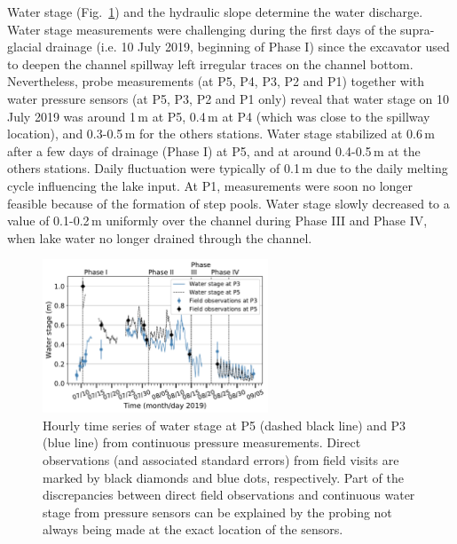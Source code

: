 Water stage (Fig.~\ref{fig:stage_P5_P3}) and the hydraulic slope determine the water discharge.
Water stage measurements were challenging  during the first days of the supra-glacial drainage (i.e. 10 July 2019, beginning of Phase I) since the excavator used to deepen the channel spillway left irregular traces on the channel bottom. Nevertheless, probe measurements (at P5, P4, P3, P2 and P1) together with water pressure sensors (at P5, P3, P2 and P1 only) reveal that water stage on 10 July 2019 was around 1\,m at P5, 0.4\,m at P4 (which was close to the spillway location), and 0.3-0.5\,m for the others stations. Water stage stabilized at 0.6\,m after a few days of drainage (Phase I) at P5, and at around 0.4-0.5\,m at the others stations. Daily fluctuation were typically of 0.1\,m due to the daily melting cycle influencing the lake input. At P1, measurements were soon no longer feasible because of the formation of step pools. Water stage slowly decreased to a value of 0.1-0.2\,m uniformly over the channel during Phase III and Phase IV, when lake water no longer drained through the channel.

\begin{figure}[h]
    \centering
    \includegraphics[width=0.6\textwidth]{chapters/chapter_plainemorte/fig05.pdf}
    \caption{Hourly time series of water stage at P5 (dashed black line) and P3 (blue line) from continuous pressure measurements. Direct observations (and associated standard errors) from field visits are marked by black diamonds and blue dots, respectively. Part of the discrepancies between direct field observations and continuous water stage from pressure sensors can be explained by the probing not always being made at the exact location of the sensors.}
    \label{fig:stage_P5_P3}
\end{figure}

\FloatBarrier


